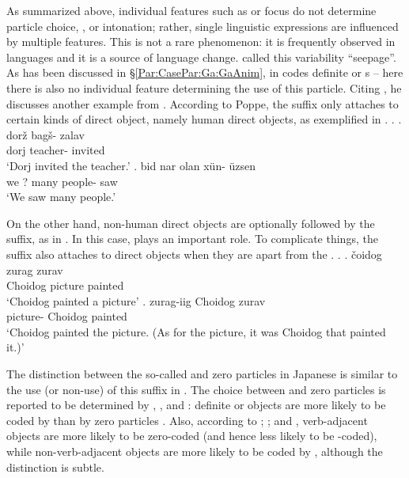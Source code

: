 As summarized above,
individual features such as  or focus do not determine
particle choice, , or intonation;
rather, single linguistic expressions are influenced by multiple features.
This is not a rare phenomenon: it is frequently observed in languages and
it is a source of language change.
 called this variability ``seepage''.
As has been discussed in \S \ref{Par:CasePar:Ga:GaAnim},
 in  codes definite or  s -- here there is also no individual feature determining the use of this particle.
Citing , he discusses another example from .
According to Poppe, the  suffix  only attaches to certain kinds of direct object, namely human direct objects, as exemplified in
\Next.
%
\ex.\label{Disc:Ex:Mongolian1}
 \ag. dor\v{z} bag\v{s}- zalav \\
	dorj teacher-{} invited \\
	`Dorj invited the teacher.'
 \bg. bid nar olan x\"{u}n- \"{u}zsen \\
	we ? many people-{} saw \\
	`We saw many people.'
	\hfill{\cite[18]{comrie79}}

On the other hand, non-human direct objects are optionally followed by the suffix, as in \Next.
In this case,
 plays an important role.
To complicate things,
the suffix also attaches to  direct objects
when they are apart from the .
%
\ex.\label{Disc:Ex:Mongolian2}
 \ag. \v{c}oidog zurag zurav \\
	Choidog picture painted \\
	`Choidog painted a picture'
 \bg. zurag-iig Choidog zurav \\
	picture- Choidog painted \\
	`Choidog painted the picture. (As for the picture, it was Choidog that painted it.)'
	\hfill{\cite[19]{comrie79}}

The distinction between the so-called   and zero particles in Japanese is similar to the use (or non-use) of this suffix  in .
The choice between  and zero particles is reported to be determined by , , and : definite or  objects are more likely to be coded by 
than by zero particles \cite{minashima01,fry01,kurumadajaeger13,kurumadajaeger15}.
Also,
according to ; ; and ,
verb-adjacent objects are more likely to be zero-coded (and hence less likely to be -coded),
while non-verb-adjacent objects are more likely to be coded by ,
although the distinction is subtle.


